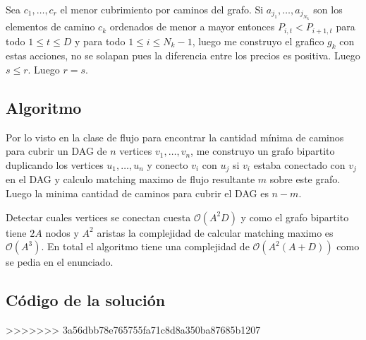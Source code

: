 	Sea $c_1,\dots ,c_r$ el menor cubrimiento por caminos del
	grafo. Si $a_{j_1},\dots ,a_{j_{N_k}}$ son los elementos de
	camino $c_k$ ordenados de menor a mayor entonces $P_{i,t}<P_{i+1,t}$
	para todo $1\leq t\leq D$ y para todo $1\leq i\leq N_k-1$, 
	luego me construyo el grafico $g_k$ con estas acciones, no se
	solapan pues la diferencia entre los precios es positiva.
	Luego $s\leq r$.
	Luego $r=s$.
	
\subsection{Algoritmo}
	Por lo visto en la clase de flujo para encontrar la cantidad mínima 
	de caminos para cubrir un DAG de $n$ vertices
	$v_1,\dots ,v_n$, me construyo un grafo bipartito duplicando los vertices
	$u_1,\dots ,u_n$ y conecto $v_i$ con $u_j$ si $v_i$ estaba conectado con 
	$v_j$ en el DAG y calculo matching maximo de flujo resultante $m$ sobre este grafo. Luego
	la minima cantidad de caminos para cubrir el DAG es $n-m$.
	
	
	Detectar cuales vertices se conectan cuesta $\mathcal{O}(A^2D)$ y como el grafo
	bipartito tiene $2A$ nodos y $A^2$ aristas la complejidad de 
	calcular matching maximo es $\mathcal{O}(A^3)$.
	En total el algoritmo tiene una complejidad de $\mathcal{O}(A^2(A+D))$ como
	se pedia en el enunciado.
\newpage
\subsection{Código de la solución}
\lstset{inputencoding=utf8/latin1}

>>>>>>> 3a56dbb78e765755fa71c8d8a350ba87685b1207
